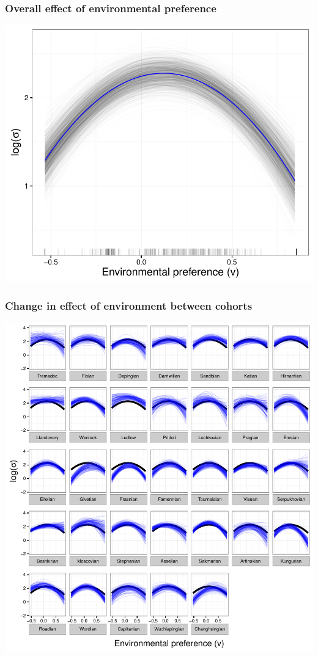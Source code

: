 \documentclass{beamer}
\begin{document}
\begin{frame}
  \frametitle{Overall effect of environmental preference}

  \includegraphics[width = \textwidth,height = 0.8\textheight,keepaspectratio = true]{figure/env_effect}
\end{frame}

%

\begin{frame}
  \frametitle{Change in effect of environment between cohorts}

  \includegraphics[width = \textwidth,height = \textheight,keepaspectratio = true]{figure/env_cohort}
\end{frame}
\end{document}
